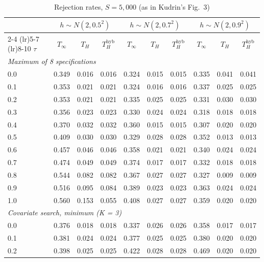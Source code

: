 \begin{table}[htbp]
\centering
\caption{Rejection rates, $S = 5{,}000$ (as in Kudrin's Fig.~3)}
\label{tab:kudrin_style_mean_dial_EKW_S5000}
\footnotesize
\setlength{\tabcolsep}{4pt}
\begin{tabular}{lccccccccc}
\toprule
 & \multicolumn{3}{c}{$h \sim N(2, 0.5^2)$} & \multicolumn{3}{c}{$h \sim N(2, 0.7^2)$} & \multicolumn{3}{c}{$h \sim N(2, 0.9^2)$} \\
\cmidrule(lr){2-4} \cmidrule(lr){5-7} \cmidrule(lr){8-10}
$\tau$ & $T_\infty$ & $T_H$ & $T_H^{\mathrm{hyb}}$ & $T_\infty$ & $T_H$ & $T_H^{\mathrm{hyb}}$ & $T_\infty$ & $T_H$ & $T_H^{\mathrm{hyb}}$ \\
\midrule
\multicolumn{10}{l}{\textit{Maximum of 8 specifications}} \\
0.0 & 0.349 & 0.016 & 0.016 & 0.324 & 0.015 & 0.015 & 0.335 & 0.041 & 0.041 \\
0.1 & 0.353 & 0.021 & 0.021 & 0.324 & 0.016 & 0.016 & 0.337 & 0.025 & 0.025 \\
0.2 & 0.353 & 0.021 & 0.021 & 0.335 & 0.025 & 0.025 & 0.331 & 0.030 & 0.030 \\
0.3 & 0.356 & 0.023 & 0.023 & 0.330 & 0.024 & 0.024 & 0.318 & 0.018 & 0.018 \\
0.4 & 0.370 & 0.032 & 0.032 & 0.360 & 0.015 & 0.015 & 0.307 & 0.020 & 0.020 \\
0.5 & 0.409 & 0.030 & 0.030 & 0.329 & 0.028 & 0.028 & 0.352 & 0.013 & 0.013 \\
0.6 & 0.457 & 0.046 & 0.046 & 0.358 & 0.021 & 0.021 & 0.340 & 0.024 & 0.024 \\
0.7 & 0.474 & 0.049 & 0.049 & 0.374 & 0.017 & 0.017 & 0.332 & 0.018 & 0.018 \\
0.8 & 0.544 & 0.082 & 0.082 & 0.367 & 0.027 & 0.027 & 0.327 & 0.009 & 0.009 \\
0.9 & 0.516 & 0.095 & 0.084 & 0.389 & 0.023 & 0.023 & 0.363 & 0.024 & 0.024 \\
1.0 & 0.560 & 0.153 & 0.055 & 0.408 & 0.027 & 0.027 & 0.359 & 0.020 & 0.020 \\
\midrule
\multicolumn{10}{l}{\textit{Covariate search, minimum (K = 3)}} \\
0.0 & 0.376 & 0.018 & 0.018 & 0.337 & 0.026 & 0.026 & 0.358 & 0.017 & 0.017 \\
0.1 & 0.381 & 0.024 & 0.024 & 0.377 & 0.025 & 0.025 & 0.380 & 0.020 & 0.020 \\
0.2 & 0.398 & 0.025 & 0.025 & 0.422 & 0.028 & 0.028 & 0.469 & 0.020 & 0.020 \\

\end{tabular}
\end{table}
